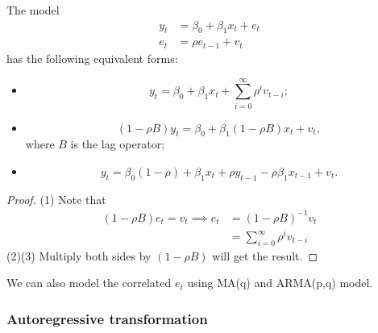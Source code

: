 \begin{refsection}
\begin{remark}
\end{remark}


\begin{lemma}\cite[361]{hill2010principles}
The model 	
\begin{align*}
y_t &= \beta_0 + \beta_1 x_t + e_t \\
e_t & = \rho e_{t-1} + v_t
\end{align*}
has the following equivalent forms:
\begin{itemize}
	\item $$y_t = \beta_0 + \beta_1 x_t + \sum_{i=0}^\infty \rho^i v_{t-i};$$
	\item $$(1 - \rho B)y_t = \beta_0 + \beta_1(1 - \rho B) x_t  + v_t,$$
	where $B$ is the lag operator;
	\item $$y_t = \beta_0(1 - \rho) + \beta_1 x_t + \rho y_{t-1} - \rho \beta_1 x_{t-1} + v_t.$$
\end{itemize} 
\end{lemma}
\begin{proof}
	(1) Note that 
\begin{align*}
	(1 - \rho B) e_t= v_t \implies e_t  &=(1 - \rho B)^{-1} v_t \\
	& =  \sum_{i=0}^\infty \rho^i v_{t-i}
\end{align*}
(2)(3) Multiply both sides by $(1 - \rho B)$ will get the result.	
\end{proof}


\begin{remark}
We can also model the correlated $e_t$ using MA(q) and ARMA(p,q) model.	
\end{remark}


\subsubsection{Autoregressive transformation}

\begin{lemma}\cite[254]{theil1971principles}


\end{lemma}
\end{refsection}
